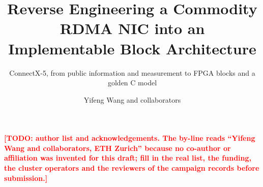 \documentclass[sigconf,nonacm]{acmart}
\newcommand{\TODO}[1]{\textcolor{red}{\textbf{[TODO: #1]}}}
\begin{document}
\title{Reverse Engineering a Commodity RDMA NIC into an
       Implementable Block Architecture}
\subtitle{ConnectX-5, from public information and measurement to
          FPGA blocks and a golden C model}

\author{Yifeng Wang and collaborators}

\renewcommand{\shortauthors}{Wang et al.}

\begin{abstract}

\end{abstract}

\maketitle










\begin{acks}
\TODO{author list and acknowledgements. The by-line reads ``Yifeng Wang and
collaborators, ETH Zurich'' because no co-author or affiliation was invented
for this draft; fill in the real list, the funding, the cluster operators and
the reviewers of the campaign records before submission.}
\end{acks}



\end{document}
